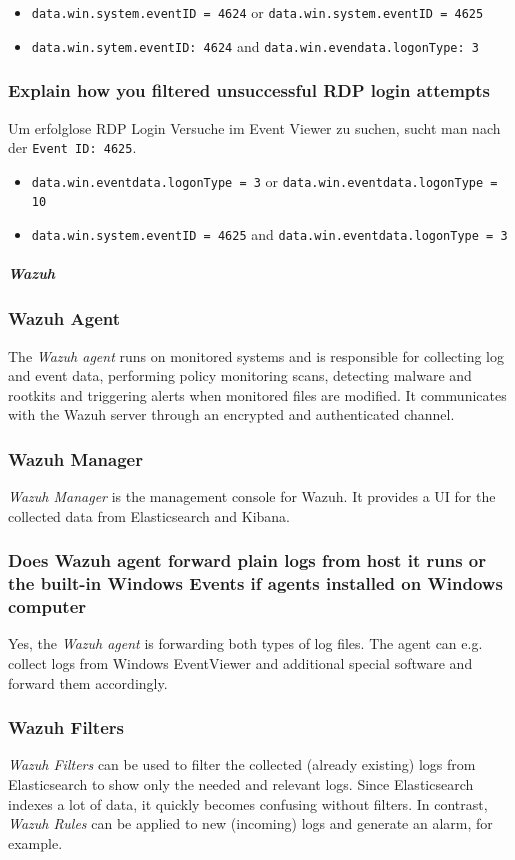 \begin{itemize}
    \item \lstinline|data.win.system.eventID = 4624| or \lstinline|data.win.system.eventID = 4625|
    \item \lstinline|data.win.sytem.eventID: 4624| and \lstinline|data.win.evendata.logonType: 3|
\end{itemize}

\subsubsection{Explain how you filtered unsuccessful RDP login attempts}
Um erfolglose RDP Login Versuche im Event Viewer zu suchen, sucht man nach der \lstinline|Event ID: 4625|.\\

\begin{itemize}
    \item \lstinline|data.win.eventdata.logonType = 3| or \lstinline|data.win.eventdata.logonType = 10|
    \item \lstinline|data.win.system.eventID = 4625| and \lstinline|data.win.eventdata.logonType = 3|
\end{itemize}

\subparagraph{Wazuh}

\subsubsection{Wazuh Agent}
The \textit{Wazuh agent} runs on monitored systems and is responsible for collecting log and event data, performing policy monitoring scans, detecting malware and rootkits and triggering alerts when monitored files are modified. It communicates with the Wazuh server through an encrypted and authenticated channel.

\subsubsection{Wazuh Manager}
\textit{Wazuh Manager} is the management console for Wazuh. It provides a UI for the collected data from Elasticsearch and Kibana.

\subsubsection{Does Wazuh agent forward plain logs from host it runs or the built-in Windows Events if agents installed on Windows computer}
Yes, the \textit{Wazuh agent} is forwarding both types of log files. The agent can e.g. collect logs from Windows EventViewer and additional special software and forward them accordingly.

\subsubsection{Wazuh Filters}
\textit{Wazuh Filters} can be used to filter the collected (already existing) logs from Elasticsearch to show only the needed and relevant logs. Since Elasticsearch indexes a lot of data, it quickly becomes confusing without filters.
In contrast, \textit{Wazuh Rules} can be applied to new (incoming) logs and generate an alarm, for example.